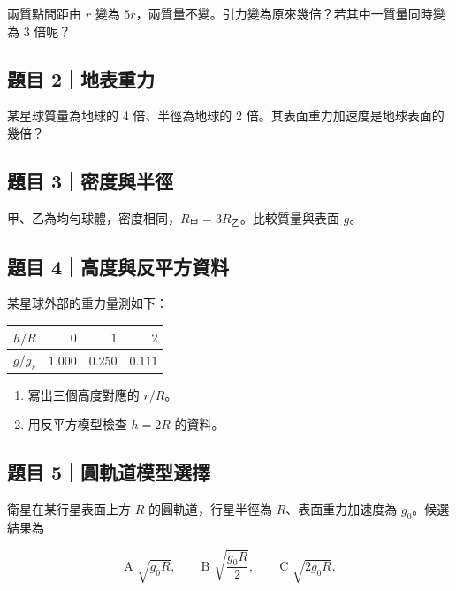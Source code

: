 \documentclass[11pt,a4paper]{article}
\newcounter{none}
\providecommand{\tightlist}{%
  \setlength{\itemsep}{0pt}\setlength{\parskip}{0pt}}
\begin{document}
兩質點間距由 \(r\) 變為 \(5r\)，兩質量不變。引力變為原來幾倍？若其中一質量同時變為 3 倍呢？

\subsection{題目 2｜地表重力}\label{ux984cux76ee-2ux5730ux8868ux91cdux529b}

某星球質量為地球的 4 倍、半徑為地球的 2 倍。其表面重力加速度是地球表面的幾倍？

\subsection{題目 3｜密度與半徑}\label{ux984cux76ee-3ux5bc6ux5ea6ux8207ux534aux5f91}

甲、乙為均勻球體，密度相同，\(R_{\text{甲}}=3R_{\text{乙}}\)。比較質量與表面 \(g\)。

\subsection{題目 4｜高度與反平方資料}\label{ux984cux76ee-4ux9ad8ux5ea6ux8207ux53cdux5e73ux65b9ux8cc7ux6599}

某星球外部的重力量測如下：

{\def\LTcaptype{none} %
\begin{longtable}[]{@{}rrrr@{}}
\toprule\noalign{}
\(h/R\) & \(0\) & \(1\) & \(2\) \\
\midrule\noalign{}
\endhead
\bottomrule\noalign{}
\endlastfoot
\(g/g_s\) & \(1.000\) & \(0.250\) & \(0.111\) \\
\end{longtable}
}

\begin{enumerate}
\def\labelenumi{\arabic{enumi}.}
\tightlist
\item
  寫出三個高度對應的 \(r/R\)。
\item
  用反平方模型檢查 \(h=2R\) 的資料。
\end{enumerate}

\subsection{題目 5｜圓軌道模型選擇}\label{ux984cux76ee-5ux5713ux8eccux9053ux6a21ux578bux9078ux64c7}

衛星在某行星表面上方 \(R\) 的圓軌道，行星半徑為 \(R\)、表面重力加速度為 \(g_0\)。候選結果為

\[
\text{A }\sqrt{g_0R},
\qquad
\text{B }\sqrt{\frac{g_0R}{2}},
\qquad
\text{C }\sqrt{2g_0R}.
\]
\end{document}

